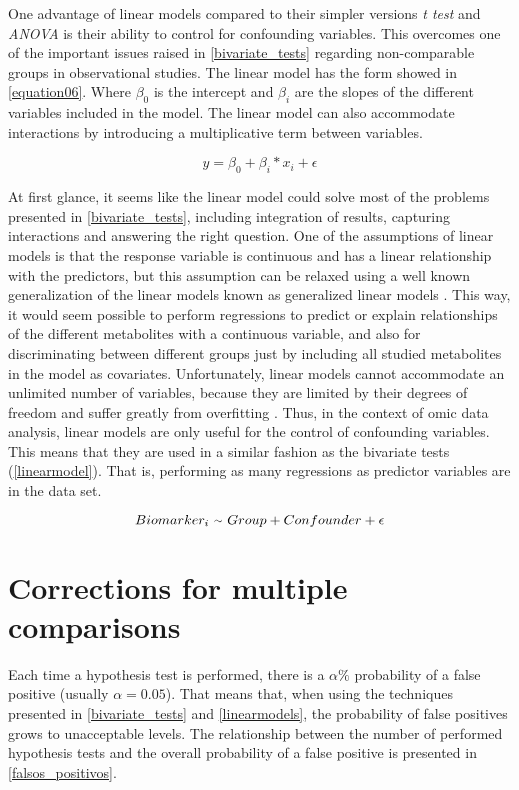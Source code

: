 One advantage of linear models compared to their simpler versions \textit{t test} and \textit{ANOVA} is their ability to control for confounding variables. This overcomes one of the important issues raised in \autoref{bivariate_tests} regarding non-comparable groups in observational studies. The linear model has the form showed in \autoref{equation06}. Where $\beta_0$ is the intercept and $\beta_i$ are the slopes of the different variables included in the model. The linear model can also accommodate interactions by introducing a multiplicative term between variables.

\begin{equation}
\label{equation06}
y=\beta_0 + \beta_i * x_i + \epsilon
\end{equation}

At first glance, it seems like the linear model could solve most of the problems presented in \autoref{bivariate_tests}, including integration of results, capturing interactions and answering the right question. One of the assumptions of linear models is that the response variable is continuous and has a linear relationship with the predictors, but this assumption can be relaxed using a well known generalization of the linear models known as generalized linear models \parencite{mcculloch2000generalized}. This way, it would seem possible to perform regressions to predict or explain relationships of the different metabolites with a continuous variable, and also for discriminating between different groups just by including all studied metabolites in the model as covariates. Unfortunately, linear models cannot accommodate an unlimited number of variables, because they are limited by their degrees of freedom and suffer greatly from overfitting \parencite{babyak2004you, hawkins2004problem}. Thus, in the context of omic data analysis, linear models are only useful for the control of confounding variables. This means that they are used in a similar fashion as the bivariate tests (\autoref{linearmodel}). That is, performing as many regressions as predictor variables are in the data set.

\begin{equation}
\label{linearmodel}
Biomarker_i\ {\raise.17ex\hbox{$\scriptstyle\sim$}}\ Group + Confounder + \epsilon
\end{equation}


\section{Corrections for multiple comparisons}
Each time a hypothesis test is performed, there is a $\alpha\%$ probability of a false positive (usually $\alpha = 0.05$). That means that, when using the techniques presented in \autoref{bivariate_tests} and \autoref{linearmodels}, the probability of false positives grows to unacceptable levels. The relationship between the number of performed hypothesis tests and the overall probability of a false positive is presented in \autoref{falsos_positivos}.


